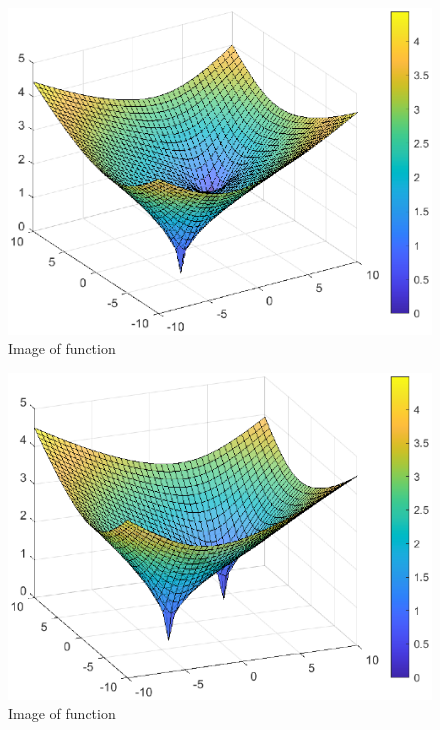 \documentclass{CSArticle}[english]
\begin{document}
\begin{figure}[h!]
\centering
\includegraphics[scale=0.4]{figure/Q2-nondiff2.eps}
\caption{Image of function }
\label{fig:Q1_crite}
\end{figure}\par


\begin{figure}[h!]
\centering
\includegraphics[scale=0.4]{figure/Q2-nondiff2asym.eps}
\caption{Image of function }
\label{fig:Q1_crite}
\end{figure}\par
\end{document}
